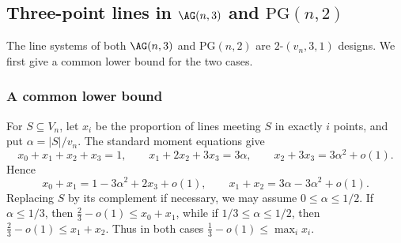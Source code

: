 \documentclass[10pt]{article}
\newcommand{\PG}{\mathrm{PG}}
\theoremstyle{definition}
\begin{document}
	

	\subsection{Three-point lines in
		\texorpdfstring{\(\AG(n,3)\) and \(\PG(n,2)\)}{AG(n,3) and PG(n,2)}}
	
	The line systems of both \(\AG(n,3)\) and \(\PG(n,2)\) are
	\(2\text{-}(v_n,3,1)\) designs. We first give a common lower bound for
	the two cases. 
	
	\medskip
	\subsubsection{ A common lower bound} For \(S\subseteq V_n\), let \(x_i\) be the proportion of
	lines meeting \(S\) in exactly \(i\) points, and put
	\(\alpha=|S|/v_n\). The standard moment equations give
	\[
	x_0+x_1+x_2+x_3=1,\qquad
	x_1+2x_2+3x_3=3\alpha,\qquad
	x_2+3x_3=3\alpha^2+o(1).
	\]
	Hence
	\[
	x_0+x_1=1-3\alpha^2+2x_3+o(1),\qquad
	x_1+x_2=3\alpha-3\alpha^2+o(1).
	\]
	Replacing \(S\) by its complement if necessary, we may assume
	\(0\leq\alpha\leq1/2\). If \(\alpha\leq1/3\), then
	\(\frac23-o(1)\leq x_0+x_1\), while if
	\(1/3\leq\alpha\leq1/2\), then
	\(\frac23-o(1)\leq x_1+x_2\). Thus in both cases
	\(\frac13-o(1)\leq\max_i x_i\).
	
\end{document}
